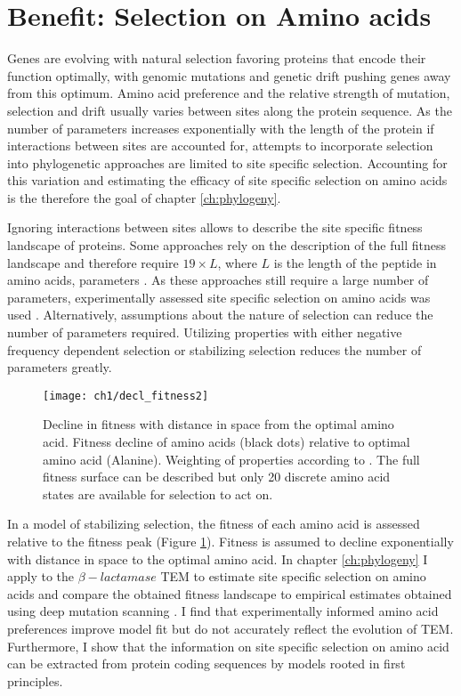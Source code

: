 \section{Benefit: Selection on Amino acids}
Genes are evolving with natural selection favoring proteins that encode their function optimally, with genomic mutations and genetic drift pushing genes away from this optimum.
Amino acid preference and the relative strength of mutation, selection and drift usually varies between sites along the protein sequence.
As the number of parameters increases exponentially with the length of the protein if interactions between sites are accounted for, attempts to incorporate selection into phylogenetic approaches are limited to site specific selection.
Accounting for this variation and estimating the efficacy of site specific selection on amino acids is the therefore the goal of chapter \ref{ch:phylogeny}.

Ignoring interactions between sites allows to describe the site specific fitness landscape of proteins.
Some approaches rely on the description of the full fitness landscape and therefore require $19 \times L$, where $L$ is the length of the peptide in amino acids, parameters \citep{LartillotAndPhilippe2004,le2008,wang2008,holder2008,wu2013,tamuri2014}.
As these approaches still require a large number of parameters, experimentally assessed site specific selection on amino acids was used \citep{bloom2014, thyagarajan2014, bloom2017}. 
Alternatively, assumptions about the nature of selection can reduce the number of parameters required.
Utilizing \PC properties with either negative frequency dependent selection \citep{GoldmanAndYang1994, MuseAndGaut1994, thorne1996} or stabilizing selection \citep{beaulieu2018} reduces the number of parameters greatly.


\singlespacing
\begin{figure}[H]
     \centering
	\texttt{[image: ch1/decl\_fitness2]}
	\caption{Decline in fitness with distance in \PC space from the optimal amino acid. 
	Fitness decline of amino acids (black dots) relative to optimal amino acid (Alanine). Weighting of \PC properties according to \citet{grantham1974}.
	The full fitness surface can be described but only 20 discrete amino acid states are available for selection to act on.}
	\label{fig:decl_fit}
\end{figure}
\doublespacing

In a model of stabilizing selection, the fitness of each amino acid is assessed relative to the fitness peak (Figure \ref{fig:decl_fit}).
Fitness is assumed to decline exponentially with distance in \PC space to the optimal amino acid.
In chapter \ref{ch:phylogeny} I apply \selac \citep{beaulieu2018} to the $\beta-lactamase$ TEM to estimate site specific selection on amino acids and compare the obtained fitness landscape to empirical estimates obtained using deep mutation scanning \citet{stiffler2016}.
I find that experimentally informed amino acid preferences improve model fit but do not accurately reflect the evolution of TEM.
Furthermore, I show that the information on site specific selection on amino acid can be extracted from protein coding sequences by models rooted in first principles.




